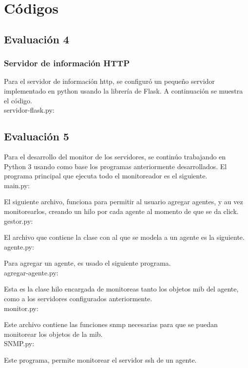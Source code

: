 \chapter{Códigos}
\section{Evaluación 4}
\subsection{Servidor de información HTTP}
\noindent
Para el servidor de información http, se configuró un pequeño servidor implementado en python usando la librería de Flask. A continuación se muestra el código.\\
servidor-flask.py:

\section{Evaluación 5}
\noindent
Para el desarrollo del monitor de los servidores, se continúo trabajando en Python 3 usando como base los programas anteriormente desarrollados. El programa principal que ejecuta todo el monitoreador es el siguiente.\\
main.py:

\noindent
El siguiente archivo, funciona para permitir al usuario agregar agentes, y au vez monitorearlos, creando un hilo por cada agente al momento de que se da click.\\
gestor.py:

\noindent
El archivo que contiene la clase con al que se modela a un agente es la siguiente.\\
agente.py:

\noindent
Para agregar un agente, es usado el siguiente programa.\\
agregar-agente.py:

\noindent
Esta es la clase hilo encargada de monitoreas tanto los objetos mib del agente, como a los servidores configurados anteriormente.\\
monitor.py:

\noindent
Este archivo contiene las funciones snmp necesarias para que se puedan monitorear los objetos de la mib.\\
SNMP.py:

\noindent
Este programa, permite monitorear el servidor ssh de un agente.\\
